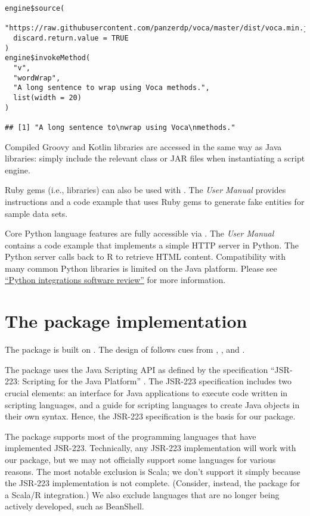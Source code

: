 \begin{verbatim}
engine$source(
  "https://raw.githubusercontent.com/panzerdp/voca/master/dist/voca.min.js",
  discard.return.value = TRUE
)
engine$invokeMethod(
  "v",
  "wordWrap",
  "A long sentence to wrap using Voca methods.",
  list(width = 20)
)

## [1] "A long sentence to\nwrap using Voca\nmethods."
\end{verbatim}

Compiled Groovy and Kotlin libraries are accessed in the same way as Java libraries: simply include the relevant class or JAR files when instantiating a script engine.

Ruby gems (i.e., libraries) can also be used with . The \textit{ User Manual} provides instructions and a code example that uses Ruby gems to generate fake entities for sample data sets.

Core Python language features are fully accessible via . The \textit{ User Manual} contains a code example that implements a simple HTTP server in Python. The Python server calls back to R to retrieve HTML content. Compatibility with many common Python libraries is limited on the Java platform. Please see \hyperlink{python-integrations}{``Python integrations software review''} for more information.

\hypertarget{the-jsr223-package-implementation}{}
\section{The  package implementation}

The  package is built on . The design of  follows cues from ,  \citep{rscala}, and  \citep{v8pkg}.

The  package uses the Java Scripting API \citep{jsa} as defined by the specification “JSR-223: Scripting for the Java Platform” \citep{jsr223spec}. The JSR-223 specification includes two crucial elements: an interface for Java applications to execute code written in scripting languages, and a guide for scripting languages to create Java objects in their own syntax. Hence, the JSR-223 specification is the basis for our package.

The  package supports most of the programming languages that have implemented JSR-223. Technically, any JSR-223 implementation will work with our package, but we may not officially support some languages for various reasons. The most notable exclusion is Scala; we don't support it simply because the JSR-223 implementation is not complete. (Consider, instead, the  package for a Scala/R integration.) We also exclude languages that are no longer being actively developed, such as BeanShell.

